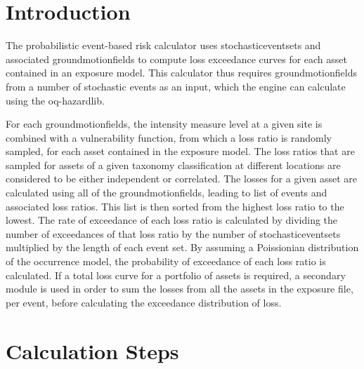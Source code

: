 \section{Introduction}
The probabilistic event-based risk calculator uses \glspl{stochasticeventset} and associated \glspl{groundmotionfield} to compute loss exceedance curves for each \gls{asset} contained in an \gls{exposure model}. This calculator thus requires \glspl{groundmotionfield} from a number of stochastic events as an input, which the engine can calculate using the oq-hazardlib.

For each \glspl{groundmotionfield}, the intensity measure level at a given site is combined with a \gls{vulnerability function}, from which a loss ratio is randomly sampled, for each \gls{asset} contained in the \gls{exposure model}. The loss ratios that are sampled for \glspl{asset} of a given \gls{taxonomy} classification at different locations are considered to be either independent or correlated. The losses for a given asset are calculated using all of the \glspl{groundmotionfield}, leading to list of events and associated loss ratios. This list is then sorted from the highest loss ratio to the lowest. The rate of exceedance of each loss ratio is calculated by dividing the number of exceedances of that loss ratio by the number of \glspl{stochasticeventset} multiplied by the length of each event set. By assuming a Poissionian distribution of the occurrence model, the probability of exceedance of each loss ratio is calculated. If a total loss curve for a portfolio of \glspl{asset} is required, a secondary module is used in order to sum the losses from all the \glspl{asset} in the exposure file, per event, before calculating the exceedance distribution of loss. 

\section{Calculation Steps}

